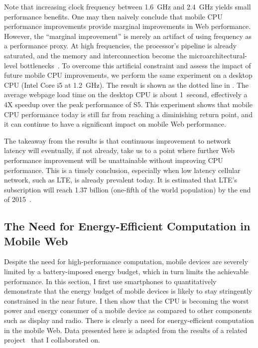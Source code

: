 Note that increasing clock frequency between 1.6~GHz and 2.4~GHz yields small performance benefits. One may then naively conclude that mobile CPU performance improvements provide marginal improvements in Web performance. However, the ``marginal improvement'' is merely an artifact of using frequency as a performance proxy. At high frequencies, the processor's pipeline is already saturated, and the memory and interconnection become the microarchitectural-level bottlenecks~\cite{clockvsipc}. To overcome this artificial constraint and assess the impact of future mobile CPU improvements, we perform the same experiment on a desktop CPU (Intel Core i5 at 1.2~GHz). The result is shown as the dotted line in . The average webpage load time on the desktop CPU is about 1~second, effectively a 4X speedup over the peak performance of S5. This experiment shows that mobile CPU performance today is still far from reaching a diminishing return point, and it can continue to have a significant impact on mobile Web performance.

The takeaway from the results is that continuous improvement to network latency will eventually, if not already, take us to a point where further Web performance improvement will be unattainable without improving CPU performance.  This is a timely conclusion, especially when low latency cellular network, such as LTE, is already prevalent today. It is estimated that LTE's subscription will reach 1.37 billion (one-fifth of the world population) by the end of 2015~\cite{lte_subscription}.

\subsection{The Need for Energy-Efficient Computation in Mobile Web}
\label{sec:motivation:energy}

Despite the need for high-performance computation, mobile devices are severely limited by a battery-imposed energy budget, which in turn limits the achievable performance. In this section, I first use smartphones to quantitatively demonstrate that the energy budget of mobile devices is likely to stay stringently constrained in the near future. I then show that the CPU is becoming the worst power and energy consumer of a mobile device as compared to other components such as display and radio. There is clearly a need for energy-efficient computation in the mobile Web. Data presented here is adapted from the results of a related project~\cite{mobilecpu} that I collaborated on.

